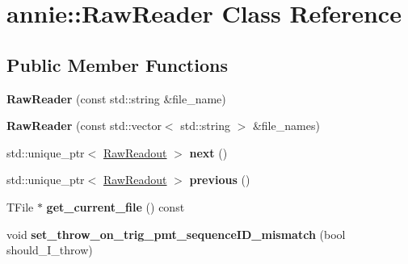 \hypertarget{classannie_1_1RawReader}{\section{annie\-:\-:Raw\-Reader Class Reference}
\label{classannie_1_1RawReader}
}
\subsection*{Public Member Functions}
\begin{DoxyCompactItemize}
\item 
\hypertarget{classannie_1_1RawReader_a3d26acd104f49e1ffde15a13d068c1e1}{{\bfseries Raw\-Reader} (const std\-::string \&file\-\_\-name)}\label{classannie_1_1RawReader_a3d26acd104f49e1ffde15a13d068c1e1}

\item 
\hypertarget{classannie_1_1RawReader_a56a7889e6662ce98990465942858d10a}{{\bfseries Raw\-Reader} (const std\-::vector$<$ std\-::string $>$ \&file\-\_\-names)}\label{classannie_1_1RawReader_a56a7889e6662ce98990465942858d10a}

\item 
\hypertarget{classannie_1_1RawReader_aabcb9bd9bd3a456524dda84f7ffacd26}{std\-::unique\-\_\-ptr$<$ \hyperlink{classannie_1_1RawReadout}{Raw\-Readout} $>$ {\bfseries next} ()}\label{classannie_1_1RawReader_aabcb9bd9bd3a456524dda84f7ffacd26}

\item 
\hypertarget{classannie_1_1RawReader_ae161fd248f9d5bc60d354b779b4760b8}{std\-::unique\-\_\-ptr$<$ \hyperlink{classannie_1_1RawReadout}{Raw\-Readout} $>$ {\bfseries previous} ()}\label{classannie_1_1RawReader_ae161fd248f9d5bc60d354b779b4760b8}

\item 
\hypertarget{classannie_1_1RawReader_a42f6db4cb672b510e20fdbb7270ce009}{T\-File $\ast$ {\bfseries get\-\_\-current\-\_\-file} () const }\label{classannie_1_1RawReader_a42f6db4cb672b510e20fdbb7270ce009}

\item 
\hypertarget{classannie_1_1RawReader_aeaeb8f323990ff57667f96305426b039}{void {\bfseries set\-\_\-throw\-\_\-on\-\_\-trig\-\_\-pmt\-\_\-sequence\-I\-D\-\_\-mismatch} (bool should\-\_\-\-I\-\_\-throw)}\label{classannie_1_1RawReader_aeaeb8f323990ff57667f96305426b039}

\end{DoxyCompactItemize}
